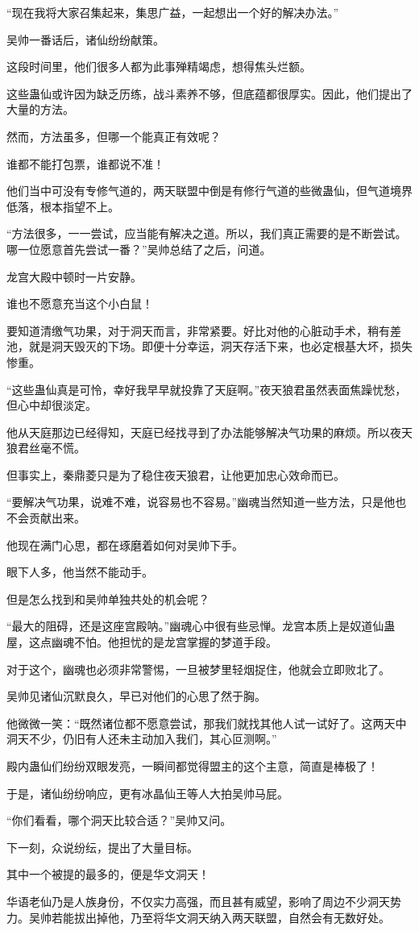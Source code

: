 \begin{this_body}
“现在我将大家召集起来，集思广益，一起想出一个好的解决办法。”

吴帅一番话后，诸仙纷纷献策。

这段时间里，他们很多人都为此事殚精竭虑，想得焦头烂额。

这些蛊仙或许因为缺乏历练，战斗素养不够，但底蕴都很厚实。因此，他们提出了大量的方法。

然而，方法虽多，但哪一个能真正有效呢？

谁都不能打包票，谁都说不准！

他们当中可没有专修气道的，两天联盟中倒是有修行气道的些微蛊仙，但气道境界低落，根本指望不上。

“方法很多，一一尝试，应当能有解决之道。所以，我们真正需要的是不断尝试。哪一位愿意首先尝试一番？”吴帅总结了之后，问道。

龙宫大殿中顿时一片安静。

谁也不愿意充当这个小白鼠！

要知道清缴气功果，对于洞天而言，非常紧要。好比对他的心脏动手术，稍有差池，就是洞天毁灭的下场。即便十分幸运，洞天存活下来，也必定根基大坏，损失惨重。

“这些蛊仙真是可怜，幸好我早早就投靠了天庭啊。”夜天狼君虽然表面焦躁忧愁，但心中却很淡定。

他从天庭那边已经得知，天庭已经找寻到了办法能够解决气功果的麻烦。所以夜天狼君丝毫不慌。

但事实上，秦鼎菱只是为了稳住夜天狼君，让他更加忠心效命而已。

“要解决气功果，说难不难，说容易也不容易。”幽魂当然知道一些方法，只是他也不会贡献出来。

他现在满门心思，都在琢磨着如何对吴帅下手。

眼下人多，他当然不能动手。

但是怎么找到和吴帅单独共处的机会呢？

“最大的阻碍，还是这座宫殿呐。”幽魂心中很有些忌惮。龙宫本质上是奴道仙蛊屋，这点幽魂不怕。他担忧的是龙宫掌握的梦道手段。

对于这个，幽魂也必须非常警惕，一旦被梦里轻烟捉住，他就会立即败北了。

吴帅见诸仙沉默良久，早已对他们的心思了然于胸。

他微微一笑：“既然诸位都不愿意尝试，那我们就找其他人试一试好了。这两天中洞天不少，仍旧有人还未主动加入我们，其心叵测啊。”

殿内蛊仙们纷纷双眼发亮，一瞬间都觉得盟主的这个主意，简直是棒极了！

于是，诸仙纷纷响应，更有冰晶仙王等人大拍吴帅马屁。

“你们看看，哪个洞天比较合适？”吴帅又问。

下一刻，众说纷纭，提出了大量目标。

其中一个被提的最多的，便是华文洞天！

华语老仙乃是人族身份，不仅实力高强，而且甚有威望，影响了周边不少洞天势力。吴帅若能拔出掉他，乃至将华文洞天纳入两天联盟，自然会有无数好处。

\end{this_body}

